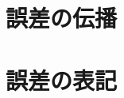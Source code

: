 \documentclass[10pt,dvipdfmx]{jsarticle}
\begin{document}
\section{誤差の伝播}


\section{誤差の表記}
\end{document}
